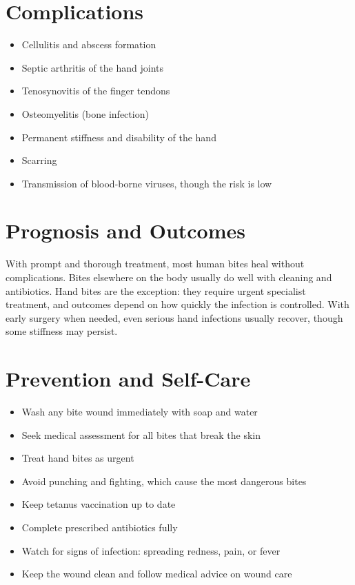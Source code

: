 \section*{Complications}
\begin{itemize}
    \item Cellulitis and abscess formation
    \item Septic arthritis of the hand joints
    \item Tenosynovitis of the finger tendons
    \item Osteomyelitis (bone infection)
    \item Permanent stiffness and disability of the hand
    \item Scarring
    \item Transmission of blood-borne viruses, though the risk is low
\end{itemize}

\section*{Prognosis and Outcomes}
With prompt and thorough treatment, most human bites heal without complications. Bites elsewhere on the body usually do well with cleaning and antibiotics. Hand bites are the exception: they require urgent specialist treatment, and outcomes depend on how quickly the infection is controlled. With early surgery when needed, even serious hand infections usually recover, though some stiffness may persist.

\section*{Prevention and Self-Care}
\begin{itemize}
    \item Wash any bite wound immediately with soap and water
    \item Seek medical assessment for all bites that break the skin
    \item Treat hand bites as urgent
    \item Avoid punching and fighting, which cause the most dangerous bites
    \item Keep tetanus vaccination up to date
    \item Complete prescribed antibiotics fully
    \item Watch for signs of infection: spreading redness, pain, or fever
    \item Keep the wound clean and follow medical advice on wound care
\end{itemize}

